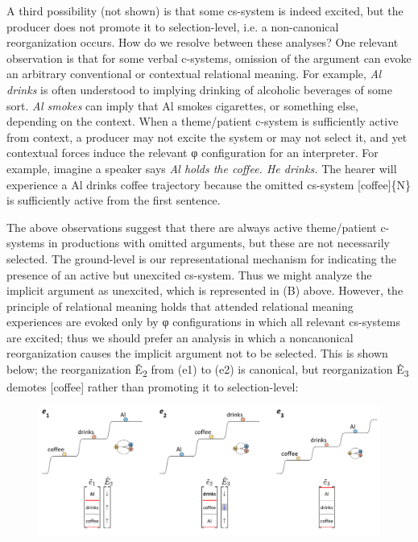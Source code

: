   A third possibility (not shown) is that some cs-system is indeed excited, but the producer does not promote it to selection-level, i.e. a non-canonical reorganization occurs. How do we resolve between these analyses? One relevant observation is that for some verbal c-systems, omission of the argument can evoke an arbitrary conventional or contextual relational meaning. For example, \textit{Al drinks} is often understood to implying drinking of alcoholic beverages of some sort. \textit{Al smokes} can imply that Al smokes cigarettes, or something else, depending on the context. When a theme/patient c-system is sufficiently active from context, a producer may not excite the system or may not select it, and yet contextual forces induce the relevant φ configuration for an interpreter. For example, imagine a speaker says \textit{Al holds the coffee. He drinks.} The hearer will experience a {\textbar}Al drinks coffee{\textbar} trajectory because the omitted cs-system [coffee]\{N\} is sufficiently active from the first sentence.

  The above observations suggest that there are always active theme/patient c-systems in productions with omitted arguments, but these are not necessarily selected. The ground-level is our representational mechanism for indicating the presence of an active but unexcited cs-system. Thus we might analyze the implicit argument as unexcited, which is represented in (B) above. However, the principle of relational meaning holds that attended relational meaning experiences are evoked only by φ configurations in which all relevant cs-systems are excited; thus we should prefer an analysis in which a noncanonical reorganization causes the implicit argument not to be selected. This is shown below; the reorganization Ê\textsubscript{2} from (e1) to (e2) is canonical, but reorganization Ê\textsubscript{3} demotes [coffee] rather than promoting it to selection-level:

  
\begin{figure}
\includegraphics[width=\textwidth]{figures/Tilsen-img87.png}
\caption{\missingcaption}
\label{fig:}
\end{figure}
 

